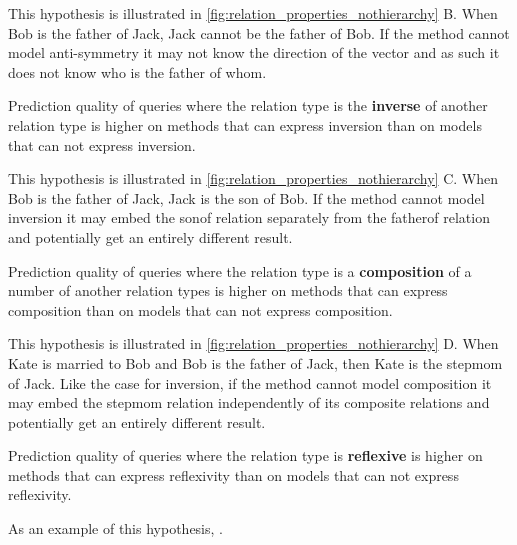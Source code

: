 This hypothesis is illustrated in \autoref{fig:relation_properties_nothierarchy} B. When Bob is the father of Jack, Jack cannot be the father of Bob. If the method cannot model anti-symmetry it may not know the direction of the vector and as such it does not know who is the father of whom.

\begin{subhypothesis}
Prediction quality of queries where the relation type is the \textbf{inverse} of another relation type is higher on methods that can express inversion than on models that can not express inversion.
\end{subhypothesis}

This hypothesis is illustrated in \autoref{fig:relation_properties_nothierarchy} C. When Bob is the father of Jack, Jack is the son of Bob. If the method cannot model inversion it may embed the sonof relation separately from the fatherof relation and potentially get an entirely different result.

\begin{subhypothesis}
Prediction quality of queries where the relation type is a \textbf{composition} of a number of another relation types is higher on methods that can express composition than on models that can not express composition.
\end{subhypothesis}

This hypothesis is illustrated in \autoref{fig:relation_properties_nothierarchy} D. When Kate is married to Bob and Bob is the father of Jack, then Kate is the stepmom of Jack. Like the case for inversion, if the method cannot model composition it may embed the stepmom relation independently of its composite relations and potentially get an entirely different result.

\begin{subhypothesis}
Prediction quality of queries where the relation type is \textbf{reflexive} is higher on methods that can express reflexivity than on models that can not express reflexivity.
\end{subhypothesis}

As an example of this hypothesis, .


% 


